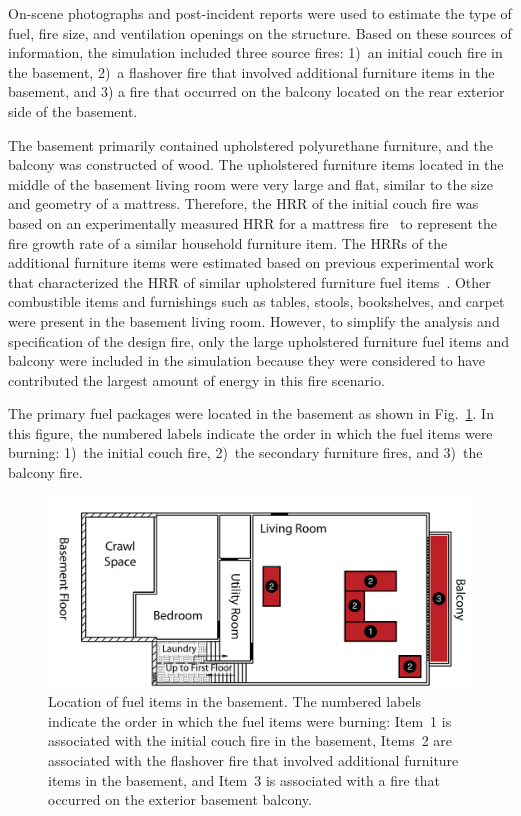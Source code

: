 \documentclass[12pt,oneside]{book}
\begin{document}
On-scene photographs and post-incident reports were used to estimate the type of fuel, fire size, and ventilation openings on the structure. Based on these sources of information, the simulation included three source fires: 1)~an initial couch fire in the basement, 2)~a flashover fire that involved additional furniture items in the basement, and 3) a fire that occurred on the balcony located on the rear exterior side of the basement.

The basement primarily contained upholstered polyurethane furniture, and the balcony was constructed of wood. The upholstered furniture items located in the middle of the basement living room were very large and flat, similar to the size and geometry of a mattress. Therefore, the HRR of the initial couch fire was based on an experimentally measured HRR for a mattress fire~\cite{madrzykowski2009fire} to represent the fire growth rate of a similar household furniture item. The HRRs of the additional furniture items were estimated based on previous experimental work that characterized the HRR of similar upholstered furniture fuel items~\cite{madrzykowski2009fire,Madrzykowski:2,Babrauskas:1}. Other combustible items and furnishings such as tables, stools, bookshelves, and carpet were present in the basement living room. However, to simplify the analysis and specification of the design fire, only the large upholstered furniture fuel items and balcony were included in the simulation because they were considered to have contributed the largest amount of energy in this fire scenario.

The primary fuel packages were located in the basement as shown in Fig.~\ref{fig:fuel_placement}. In this figure, the numbered labels indicate the order in which the fuel items were burning: 1)~the initial couch fire, 2)~the secondary furniture fires, and 3)~the balcony fire.

\begin{figure}[!ht]
\includegraphics[width=5.5in]{../Figures/Plan_Basement_Fuels}
\caption[Location of fuel items in the basement.]
{Location of fuel items in the basement. The numbered labels indicate the order in which the fuel items were burning: Item~1 is associated with the initial couch fire in the basement, Items~2 are associated with the flashover fire that involved additional furniture items in the basement, and Item~3 is associated with a fire that occurred on the exterior basement balcony.}
\label{fig:fuel_placement}
\end{figure}
\end{document}
